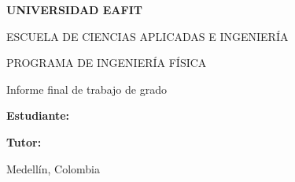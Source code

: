 \begin{titlepage}
\centering
\vspace*{1cm}

{\large\bfseries UNIVERSIDAD EAFIT\par}
\vspace{0.3cm}
{\large ESCUELA DE CIENCIAS APLICADAS E INGENIERÍA\par}
\vspace{0.3cm}
{\large PROGRAMA DE INGENIERÍA FÍSICA\par}

\vspace{3cm}

{\Large\bfseries \titulotrabajo\par}

\vspace{2cm}

{\large Informe final de trabajo de grado\par}

\vspace{3cm}

{\large\textbf{Estudiante:}\par}
{\large \autor\par}
\vspace{0.5cm}
{\large\textbf{Tutor:}\par}
{\large \tutor\par}
{\normalsize \titulotutor\par}

\vfill

{\large Medellín, Colombia\par}
{\large \fechaentrega\par}
\end{titlepage}
